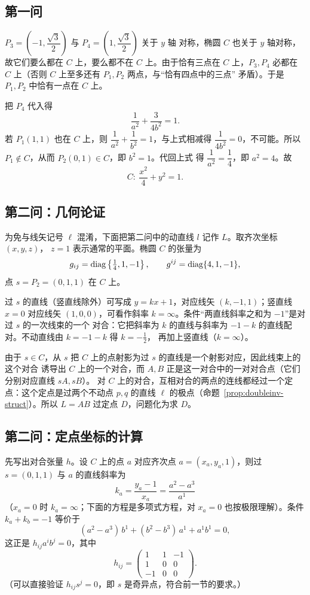 \subsection{第一问}

$P_3=\left(-1,\dfrac{\sqrt3}{2}\right)$ 与 $P_4=\left(1,\dfrac{\sqrt3}{2}\right)$ 关于 $y$ 轴
对称，椭圆 $C$ 也关于 $y$ 轴对称，故它们要么都在 $C$ 上，要么都不在 $C$ 上。由于恰有三点在
$C$ 上，$P_3,P_4$ 必都在 $C$ 上（否则 $C$ 上至多还有 $P_1,P_2$ 两点，与“恰有四点中的三点”
矛盾）。于是 $P_1,P_2$ 中恰有一点在 $C$ 上。

把 $P_4$ 代入得
\[
\frac{1}{a^2}+\frac{3}{4b^2}=1 .
\]
若 $P_1(1,1)$ 也在 $C$ 上，则 $\dfrac{1}{a^2}+\dfrac{1}{b^2}=1$，与上式相减得
$\dfrac{1}{4b^2}=0$，不可能。所以 $P_1\notin C$，从而 $P_2(0,1)\in C$，即 $b^2=1$。代回上式
得 $\dfrac{1}{a^2}=\dfrac14$，即 $a^2=4$。故
\[
C:\ \frac{x^2}{4}+y^2=1 .
\]

\subsection{第二问：几何论证}

为免与线矢记号 $\ell$ 混淆，下面把第二问中的动直线 $l$ 记作 $L$。取齐次坐标 $(x,y,z)$，
$z=1$ 表示通常的平面。椭圆 $C$ 的张量为
\[
g_{ij}=\operatorname{diag}\left\{\tfrac14,1,-1\right\},\qquad
g^{ij}=\operatorname{diag}\{4,1,-1\},
\]
点 $s=P_2=(0,1,1)$ 在 $C$ 上。

过 $s$ 的直线（竖直线除外）可写成 $y=kx+1$，对应线矢 $(k,-1,1)$；竖直线 $x=0$ 对应线矢
$(1,0,0)$，可看作斜率 $k=\infty$。条件“两直线斜率之和为 $-1$”是对过 $s$ 的一次线束的一个
对合：它把斜率为 $k$ 的直线与斜率为 $-1-k$ 的直线配对。不动直线由 $k=-1-k$ 得 $k=-\tfrac12$，
再加上竖直线（$k=\infty$）。

由于 $s\in C$，从 $s$ 把 $C$ 上的点射影为过 $s$ 的直线是一个射影对应，因此线束上的这个对合
诱导出 $C$ 上的一个对合，而 $A,B$ 正是这一对合中的一对对合点（它们分别对应直线 $sA,sB$）。
对 $C$ 上的对合，互相对合的两点的连线都经过一个定点：这个定点是过两个不动点 $p,q$ 的直线
$\ell$ 的极点（命题~\ref{prop:doubleinv-struct}）。所以 $L=AB$ 过定点 $D$，问题化为求 $D$。

\subsection{第二问：定点坐标的计算}

先写出对合张量 $h$。设 $C$ 上的点 $a$ 对应齐次点 $a=(x_a,y_a,1)$，则过 $s=(0,1,1)$ 与 $a$
的直线斜率为
\[
k_a=\frac{y_a-1}{x_a}=\frac{a^2-a^3}{a^1}
\]
（$x_a=0$ 时 $k_a=\infty$；下面的方程是多项式方程，对 $x_a=0$ 也按极限理解）。条件
$k_a+k_b=-1$ 等价于
\[
(a^2-a^3)\,b^1+(b^2-b^3)\,a^1+a^1b^1=0,
\]
这正是 $h_{ij}a^ib^j=0$，其中
\[
h_{ij}=
\begin{pmatrix}
1 & 1 & -1\\
1 & 0 & 0\\
-1 & 0 & 0
\end{pmatrix}.
\]
（可以直接验证 $h_{ij}s^j=0$，即 $s$ 是奇异点，符合前一节的要求。）

